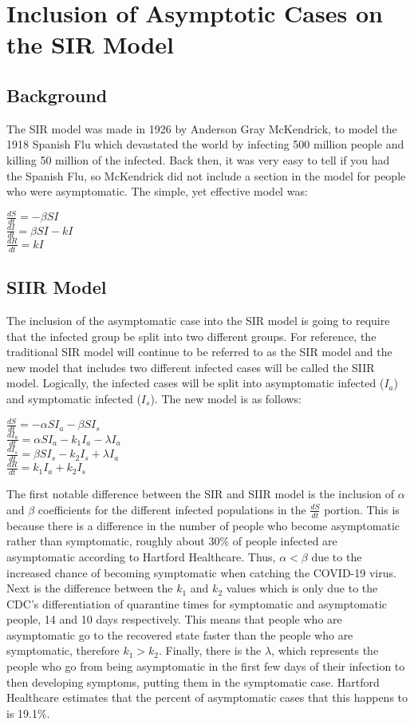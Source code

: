 \documentclass[12pt]{article} %
\begin{document}
\section{Inclusion of Asymptotic Cases on the SIR Model}
\subsection {Background}
The SIR model was made in 1926 by Anderson Gray McKendrick, to model the 1918 Spanish Flu which devastated the world by infecting 500 million people and killing 50 million of the infected. Back then, it was very easy to tell if you had the Spanish Flu, so McKendrick did not include a section in the model for people who were asymptomatic. The simple, yet effective model was: 
\begin{center}
$\frac{dS}{dt} = -\beta SI$\\
$\frac{dI}{dt} = \beta SI - kI$\\
$\frac{dR}{dt} = kI$
\end{center}
\subsection {SIIR Model}
The inclusion of the asymptomatic case into the SIR model is going to require that the infected group be split into two different groups. For reference, the traditional SIR model will continue to be referred to as the SIR model and the new model that includes two different infected cases will be called the SIIR model. Logically, the infected cases will be split into asymptomatic infected ($I_a$) and symptomatic infected ($I_s$). The new model is as follows:
\begin{center}
$\frac{dS}{dt} = -\alpha SI_a-\beta SI_s$\\
$\frac{dI_a}{dt} = \alpha SI_a - k_1I_a - \lambda I_a$\\
$\frac{dI_s}{dt} = \beta SI_s - k_2I_s + \lambda I_a$\\
$\frac{dR}{dt} = k_1I_a + k_2I_s$
\end{center}

The first notable difference between the SIR and SIIR model is the inclusion of $\alpha$ and $\beta$ coefficients for the different infected populations in the $\frac{dS}{dt}$ portion. This is because there is a difference in the number of people who become asymptomatic rather than symptomatic, roughly about 30\% of people infected are asymptomatic according to Hartford Healthcare. Thus, $\alpha < \beta$ due to the increased chance of becoming symptomatic when catching the COVID-19 virus. Next is the difference between the $k_1$ and $k_2$ values which is only due to the CDC's differentiation of quarantine times for symptomatic and asymptomatic people, 14 and 10 days respectively. This means that people who are asymptomatic go to the recovered state faster than the people who are symptomatic, therefore $k_1 > k_2$. Finally, there is the $\lambda$, which represents the people who go from being asymptomatic in the first few days of their infection to then developing symptoms, putting them in the symptomatic case. Hartford Healthcare estimates that the percent of asymptomatic cases that this happens to is 19.1\%.
\end{document}
